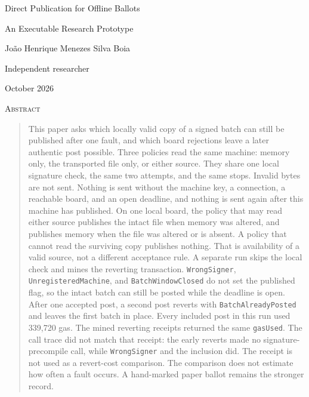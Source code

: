 \documentclass[11pt]{article}
\begin{document}
\begin{center}
{\LARGE Direct Publication for Offline Ballots\par}
\vspace{0.55em}
{\Large An Executable Research Prototype\par}
\vspace{1.15em}
{\large Jo\~ao Henrique Menezes Silva Boia\par}
\vspace{0.35em}
Independent researcher\par
\vspace{0.2em}
October 2026
\end{center}

\vspace{0.6em}
\begin{center}
{\large\scshape Abstract}
\end{center}
\begin{quote}
This paper asks which locally valid copy of a signed batch can still be published after one fault, and which board rejections leave a later authentic post possible. Three policies read the same machine: memory only, the transported file only, or either source. They share one local signature check, the same two attempts, and the same stops. Invalid bytes are not sent. Nothing is sent without the machine key, a connection, a reachable board, and an open deadline, and nothing is sent again after this machine has published. On one local board, the policy that may read either source publishes the intact file when memory was altered, and publishes memory when the file was altered or is absent. A policy that cannot read the surviving copy publishes nothing. That is availability of a valid source, not a different acceptance rule. A separate run skips the local check and mines the reverting transaction. \texttt{WrongSigner}, \texttt{UnregisteredMachine}, and \texttt{BatchWindowClosed} do not set the published flag, so the intact batch can still be posted while the deadline is open. After one accepted post, a second post reverts with \texttt{BatchAlreadyPosted} and leaves the first batch in place. Every included post in this run used 339{,}720 gas. The mined reverting receipts returned the same \texttt{gasUsed}. The call trace did not match that receipt: the early reverts made no signature-precompile call, while \texttt{WrongSigner} and the inclusion did. The receipt is not used as a revert-cost comparison. The comparison does not estimate how often a fault occurs. A hand-marked paper ballot remains the stronger record.
\end{quote}
\end{document}
